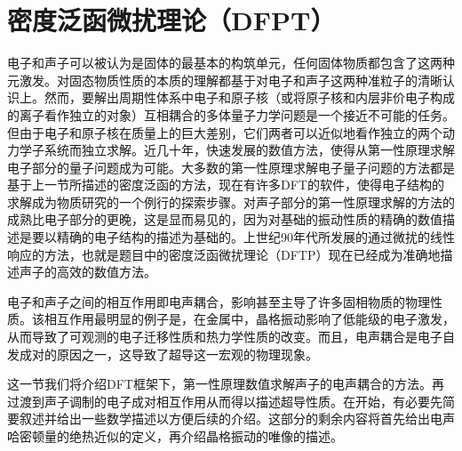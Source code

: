 \section{密度泛函微扰理论（DFPT）}

电子和声子可以被认为是固体的最基本的构筑单元，任何固体物质都包含了这两种元激发。对固态物质性质的本质的理解都基于对电子和声子这两种准粒子的清晰认识上。然而，要解出周期性体系中电子和原子核（或将原子核和内层非价电子构成的离子看作独立的对象）互相耦合的多体量子力学问题是一个接近不可能的任务。但由于电子和原子核在质量上的巨大差别，它们两者可以近似地看作独立的两个动力学子系统而独立求解。近几十年，快速发展的数值方法，使得从第一性原理求解电子部分的量子问题成为可能。大多数的第一性原理求解电子量子问题的方法都是基于上一节所描述的密度泛函的方法，现在有许多DFT的软件，使得电子结构的求解成为物质研究的一个例行的探索步骤。对声子部分的第一性原理求解的方法的成熟比电子部分的更晚，这是显而易见的，因为对基础的振动性质的精确的数值描述是要以精确的电子结构的描述为基础的。上世纪90年代所发展的通过微扰的线性响应的方法，也就是题目中的密度泛函微扰理论（DFTP）现在已经成为准确地描述声子的高效的数值方法。

电子和声子之间的相互作用即电声耦合，影响甚至主导了许多固相物质的物理性质。该相互作用最明显的例子是，在金属中，晶格振动影响了低能级的电子激发，从而导致了可观测的电子迁移性质和热力学性质的改变。而且，电声耦合是电子自发成对的原因之一，这导致了超导这一宏观的物理现象。

这一节我们将介绍DFT框架下，第一性原理数值求解声子的电声耦合的方法。再过渡到声子调制的电子成对相互作用从而得以描述超导性质。在开始，有必要先简要叙述并给出一些数学描述以方便后续的介绍。这部分的剩余内容将首先给出电声哈密顿量的绝热近似的定义，再介绍晶格振动的唯像的描述。


